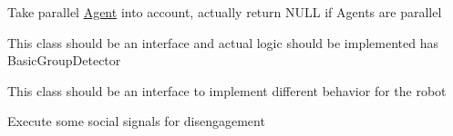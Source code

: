 
\begin{DoxyRefList}
\item[\label{todo__todo000001}%
\hypertarget{todo__todo000001}{}%
Member \hyperlink{classAgent_aef81d0795b37875777ca21d6d866ce31}{Agent\+:\+:get\+F\+O\+V\+Intersection} (\hyperlink{classAgent}{Agent} $\ast$agent)]Take parallel \hyperlink{classAgent}{Agent} into account, actually return N\+U\+LL if Agents are parallel  
\item[\label{todo__todo000002}%
\hypertarget{todo__todo000002}{}%
Class \hyperlink{classGroupDetector}{Group\+Detector} ]This class should be an interface and actual logic should be implemented has Basic\+Group\+Detector  
\item[\label{todo__todo000003}%
\hypertarget{todo__todo000003}{}%
Class \hyperlink{classSocialPlanner}{Social\+Planner} ]This class should be an interface to implement different behavior for the robot  
\item[\label{todo__todo000004}%
\hypertarget{todo__todo000004}{}%
Member \hyperlink{classSocialPlanner_abe00dd899b52d575bbd37663e6154967}{Social\+Planner\+:\+:disengage} ()]Execute some social signals for disengagement 
\end{DoxyRefList}